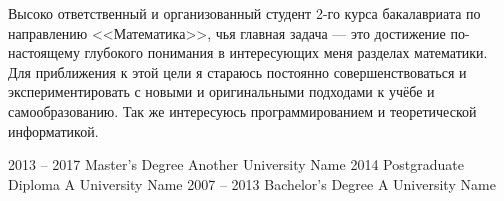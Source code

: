 \documentclass[9pt]{developercv} %
\begin{document}

\begin{minipage}[t]{0.4\textwidth} %
    Высоко ответственный и организованный студент 2-го курса бакалавриата по направлению <<Математика>>, чья главная задача --- это достижение по-настоящему глубокого понимания в интересующих меня разделах математики. Для приближения к этой цели я стараюсь постоянно совершенствоваться и экспериментировать с новыми и оригинальными подходами к учёбе и самообразованию. Так же интересуюсь программированием и теоретической информатикой.
\end{minipage}
\hfill %
\begin{minipage}[t]{0.5\textwidth} %
	\vspace{-\baselineskip} %
	\begin{barchart}{5.5}
	\end{barchart}
\end{minipage}



\begin{entrylist}
	\entry
		{2013 -- 2017}
		{Master's Degree}
		{Another University Name}
		{\lorem\lorem\lorem}
	\entry
		{2014}
		{Postgraduate Diploma}
		{A University Name}
		{\lorem\lorem}
	\entry
		{2007 -- 2013}
		{Bachelor's Degree}
		{A University Name}
		{\lorem\lorem}
\end{entrylist}

\end{document}
